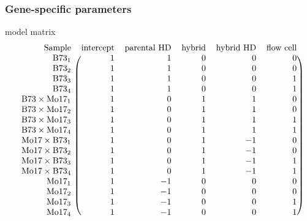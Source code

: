 \documentclass[handout]{beamer}
\begin{document}
\begin{frame}%
  \frametitle{Gene-specific parameters}
  \begin{beamerboxesrounded}[upper=upcol,lower=lowcol,shadow=true]{model matrix}
    \centering
    \scriptsize
      \[
        \begin{blockarray}{rrrrrr}
          \mbox{Sample} & \mbox{intercept} & \mbox{parental HD} & \mbox{hybrid} & \mbox{hybrid HD} & \mbox{flow cell}\\
          \begin{block}{r(rrrrr)}
            \mbox{B73}_1  & 1 &  1 & 0 & 0 & 0\\
            \mbox{B73}_2  & 1 &  1 & 0 & 0 & 0\\
            \mbox{B73}_3  & 1 &  1 & 0 & 0 & 1\\
            \mbox{B73}_4  & 1 &  1 & 0 & 0 & 1\\
            \mbox{B73}\times \mbox{Mo17}_1  & 1 &  0 & 1 & 1 & 0\\
            \mbox{B73}\times \mbox{Mo17}_2  & 1 &  0 & 1 & 1 & 0\\
            \mbox{B73}\times \mbox{Mo17}_3  & 1 &  0 & 1 & 1 & 1\\
            \mbox{B73}\times \mbox{Mo17}_4  & 1 &  0 & 1 & 1 & 1\\
            \mbox{Mo17}\times \mbox{B73}_1  & 1 &  0 & 1 & -1 & 0\\
            \mbox{Mo17}\times \mbox{B73}_2  & 1 &  0 & 1 & -1 & 0\\
            \mbox{Mo17}\times \mbox{B73}_3  & 1 &  0 & 1 & -1 & 1\\
            \mbox{Mo17}\times \mbox{B73}_4  & 1 &  0 & 1 & -1 & 1\\
            \mbox{Mo17}_1 & 1 & -1 & 0 & 0 & 0\\
            \mbox{Mo17}_2 & 1 & -1 & 0 & 0 & 0\\
            \mbox{Mo17}_3 & 1 & -1 & 0 & 0 & 1\\
            \mbox{Mo17}_4 & 1 & -1 & 0 & 0 & 1\\
          \end{block}
        \end{blockarray}
      \]
  \end{beamerboxesrounded}
\end{frame}
\end{document}
